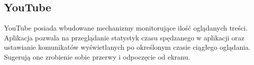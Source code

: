 \bigskip
{}

\subsection{YouTube}
\label{sec:youtube}
YouTube posiada wbudowane mechanizmy monitorujące ilość oglądanych treści. Aplikacja pozwala na przeglądanie statystyk czasu spędzanego w aplikacji oraz ustawianie komunikatów wyświetlanych po określonym czasie ciągłego oglądania. Sugerują one zrobienie sobie przerwy i odpoczęcie od ekranu.

\bigskip
{}
